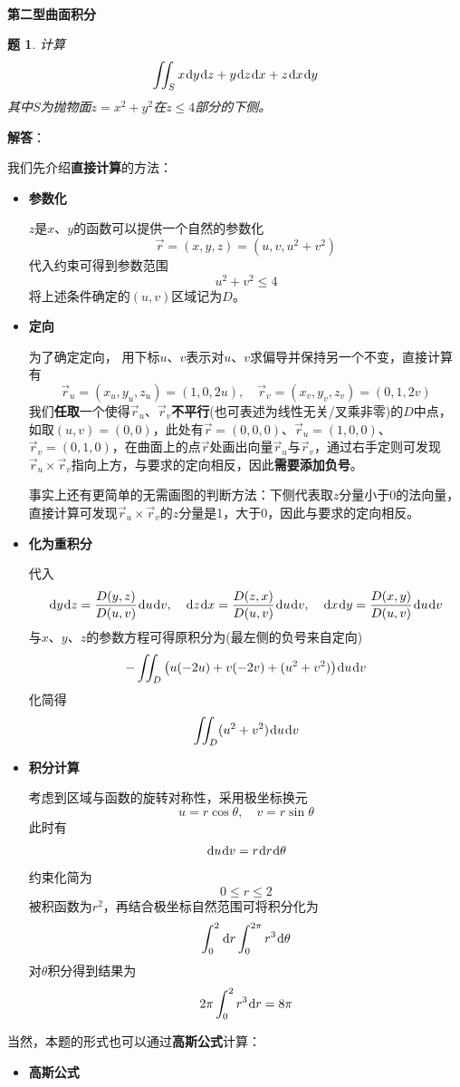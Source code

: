 \documentclass[a4paper,UTF8,fontset=windows,AutoFakeBold]{ctexart}
\newcommand*{\dr}{\hspace{0.07em}\mathrm{d}}
\newcommand*{\rv}{\vec{r}}
\newcommand*{\note}{\noindent *}
\theoremstyle{ex}
\newtheorem{exercise}{题}
\newcommand{\sol}[1]{{\vspace{5pt}\kaishu\noindent\textbf{解答}：\vspace{-3pt}
\begin{compactitem}
    \item[] #1
\end{compactitem}
}}
\begin{document}
\

\noindent\textbf{第二型曲面积分}
\begin{framed}
\begin{exercise}
    计算
    $$\iint_Sx\dr y\dr z+y\dr z\dr x+z\dr x\dr y$$
    其中$S$为抛物面$z=x^2+y^2$在$z\le4$部分的下侧。
\end{exercise}
\sol{
    我们先介绍\textbf{直接计算}的方法：
    \begin{itemize}
        \item \textbf{参数化}
        
        $z$是$x$、$y$的函数可以提供一个自然的参数化
        $$\rv=(x,y,z)=(u,v,u^2+v^2)$$
        代入约束可得到参数范围
        $$u^2+v^2\le4$$
        将上述条件确定的$(u,v)$区域记为$D$。

        \item \textbf{定向}
        
        为了确定定向， 用下标$u$、$v$表示对$u$、$v$求偏导并保持另一个不变，直接计算有
        $$\rv_u=(x_u,y_u,z_u)=(1,0,2u),\quad\rv_v=(x_v,y_v,z_v)=(0,1,2v)$$
        我们\textbf{任取}一个使得$\rv_u$、$\rv_v$\textbf{不平行}(也可表述为线性无关/叉乘非零)的$D$中点，如取$(u,v)=(0,0)$，此处有$\rv=(0,0,0)$、$\rv_u=(1,0,0)$、$\rv_v=(0,1,0)$，在曲面上的点$\rv$处画出向量$\rv_u$与$\rv_v$，通过右手定则可发现$\rv_u\times\rv_v$指向上方，与要求的定向相反，因此\textbf{需要添加负号}。

        \note 事实上还有更简单的无需画图的判断方法：下侧代表取$z$分量小于0的法向量，直接计算可发现$\rv_u\times\rv_v$的$z$分量是1，大于0，因此与要求的定向相反。

        \item \textbf{化为重积分}
        
        代入
        $$\dr y\dr z=\frac{D(y,z)}{D(u,v)}\dr u\dr v,\quad\dr z\dr x=\frac{D(z,x)}{D(u,v)}\dr u\dr v,\quad\dr x\dr y=\frac{D(x,y)}{D(u,v)}\dr u\dr v$$
        与$x$、$y$、$z$的参数方程可得原积分为(最左侧的负号来自定向)
        $$-\iint_D\big(u(-2u)+v(-2v)+(u^2+v^2)\big)\dr u\dr v$$
        化简得
        $$\iint_D(u^2+v^2)\dr u\dr v$$

        \item \textbf{积分计算}
        
        考虑到区域与函数的旋转对称性，采用极坐标换元
        $$u=r\cos\theta,\quad v=r\sin\theta$$
        此时有
        $$\dr u\dr v=r\dr r\dr\theta$$
        约束化简为
        $$0\le r\le2$$
        被积函数为$r^2$，再结合极坐标自然范围可将积分化为
        $$\int_0^2\dr r\int_0^{2\pi}r^3\dr\theta$$
        对$\theta$积分得到结果为
        $$2\pi\int_0^2r^3\dr r=8\pi$$
    \end{itemize}
    当然，本题的形式也可以通过\textbf{高斯公式}计算：
    \begin{itemize}
        \item \textbf{高斯公式}
        

\end{itemize}}
\end{framed}
\end{document}
